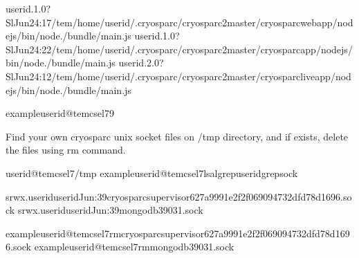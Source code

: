 \documentclass[a4paper,10pt,english]{sphinxmanual}
\begin{document}
\begin{sphinxVerbatim}[commandchars=\\\{\}]
userid.1.0?SlJun24:17/tem/home/userid/.cryosparc/cryosparc2\PYGZus{}master/cryosparc\PYGZus{}webapp/nodejs/bin/node./bundle/main.js
userid.1.0?SlJun24:22/tem/home/userid/.cryosparc/cryosparc2\PYGZus{}master/cryosparc\PYGZus{}app/nodejs/bin/node./bundle/main.js
userid.2.0?SlJun24:12/tem/home/userid/.cryosparc/cryosparc2\PYGZus{}master/cryosparc\PYGZus{}liveapp/nodejs/bin/node./bundle/main.js

exampleuserid@tem\PYGZhy{}cs\PYGZhy{}el7\PYGZdl{}\PYGZgt{}\PYGZhy{}9
\end{sphinxVerbatim}

\sphinxAtStartPar
Find your own cryosparc unix socket files on /tmp directory, and if exists, delete the files using rm command.

\begin{sphinxVerbatim}[commandchars=\\\{\}]
userid@tem\PYGZhy{}cs\PYGZhy{}el7\PYGZdl{}\PYGZgt{}/tmp
exampleuserid@tem\PYGZhy{}cs\PYGZhy{}el7\PYGZdl{}\PYGZgt{}ls\PYGZhy{}algrep\PYGZlt{}userid\PYGZgt{}grepsock

srwx\PYGZhy{}\PYGZhy{}\PYGZhy{}\PYGZhy{}\PYGZhy{}\PYGZhy{}.useriduseridJun:39cryosparc\PYGZhy{}supervisor\PYGZhy{}627a9991e2f2f069094732dfd78d1696.sock
srwx\PYGZhy{}\PYGZhy{}\PYGZhy{}\PYGZhy{}\PYGZhy{}\PYGZhy{}.useriduseridJun:39mongodb\PYGZhy{}39031.sock

exampleuserid@tem\PYGZhy{}cs\PYGZhy{}el7\PYGZdl{}\PYGZgt{}rmcryosparc\PYGZhy{}supervisor\PYGZhy{}627a9991e2f2f069094732dfd78d1696.sock
exampleuserid@tem\PYGZhy{}cs\PYGZhy{}el7\PYGZdl{}\PYGZgt{}rmmongodb\PYGZhy{}39031.sock
\end{sphinxVerbatim}
\end{document}
